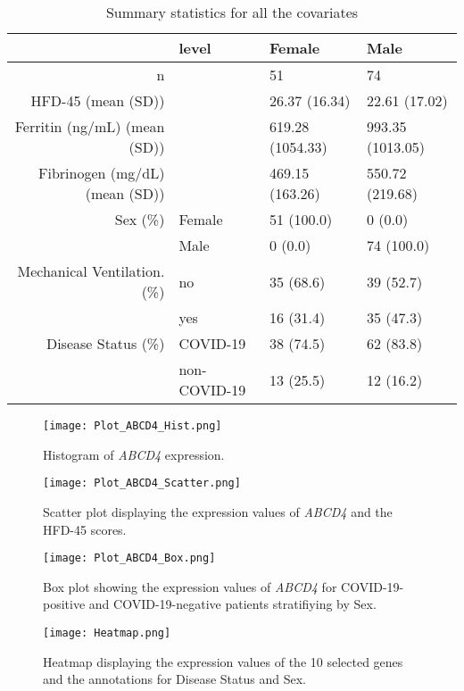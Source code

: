 \documentclass[11pt,a4paper]{article}
\begin{document}
\begin{table}[ht]
\centering
\begin{tabular}{rlll}
  \hline
 & level & Female & Male \\ 
  \hline
n &  & 51 & 74 \\ 
  HFD-45 (mean (SD)) &  & 26.37 (16.34) & 22.61 (17.02) \\ 
  Ferritin (ng/mL) (mean (SD))&  & 619.28 (1054.33) & 993.35 (1013.05) \\ 
  Fibrinogen (mg/dL) (mean (SD)) &  & 469.15 (163.26) & 550.72 (219.68) \\ 
  Sex (\%) & Female & 51 (100.0) & 0 (0.0) \\ 
   & Male & 0 (0.0) & 74 (100.0) \\ 
  Mechanical Ventilation.  (\%) & no & 35 (68.6) & 39 (52.7) \\ 
   & yes & 16 (31.4) & 35 (47.3) \\ 
  Disease Status  (\%) & COVID-19 & 38 (74.5) & 62 (83.8) \\ 
   & non-COVID-19 & 13 (25.5) & 12 (16.2) \\ 
   \hline
\end{tabular}
\caption{Summary statistics for all the covariates}
\label{tab:Table1}
\end{table}



\begin{figure}[ht]
    \centering
    \texttt{[image: Plot\_ABCD4\_Hist.png]}
    \caption{Histogram of \textit{ABCD4}  expression.}
    \label{fig:Figure1}
\end{figure}

\begin{figure}[ht]
    \centering
    \texttt{[image: Plot\_ABCD4\_Scatter.png]}
    \caption{Scatter plot displaying the expression values  of \textit{ABCD4}  and the HFD-45 scores.}
    \label{fig:Figure2}
\end{figure}

\begin{figure}[ht]
    \centering
    \texttt{[image: Plot\_ABCD4\_Box.png]}
    \caption{Box plot showing the expression values  of \textit{ABCD4}  for COVID-19-positive and COVID-19-negative patients stratifiying by Sex.}
    \label{fig:Figure3}
\end{figure}

\begin{figure}[ht]
    \centering
    \texttt{[image: Heatmap.png]}
    \caption{Heatmap  displaying the expression values  of the 10 selected genes and the annotations for Disease Status and Sex.}
    \label{fig:Figure4}
\end{figure}
\end{document}
